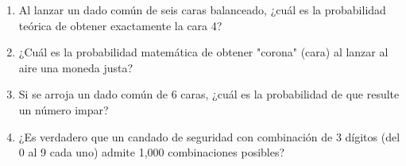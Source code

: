 \documentclass[10pt,a4paper]{article}
\begin{document}
\begin{enumerate}[label=\textbf{\arabic*.}]
\begin{enumerate}[label=\textbf{\Alph*)}]
\end{enumerate}
\vspace{0.15cm}
\item Al lanzar un dado común de seis caras balanceado, ¿cuál es la probabilidad teórica de obtener exactamente la cara 4?
\begin{enumerate}[label=\textbf{\Alph*)}]
\end{enumerate}
\vspace{0.15cm}
\item ¿Cuál es la probabilidad matemática de obtener "corona" (cara) al lanzar al aire una moneda justa?
\begin{enumerate}[label=\textbf{\Alph*)}]
\end{enumerate}
\vspace{0.15cm}
\item Si se arroja un dado común de 6 caras, ¿cuál es la probabilidad de que resulte un número impar?
\begin{enumerate}[label=\textbf{\Alph*)}]
\end{enumerate}
\vspace{0.15cm}
\item ¿Es verdadero que un candado de seguridad con combinación de 3 dígitos (del 0 al 9 cada uno) admite 1,000 combinaciones posibles?

\end{enumerate}
\end{document}
